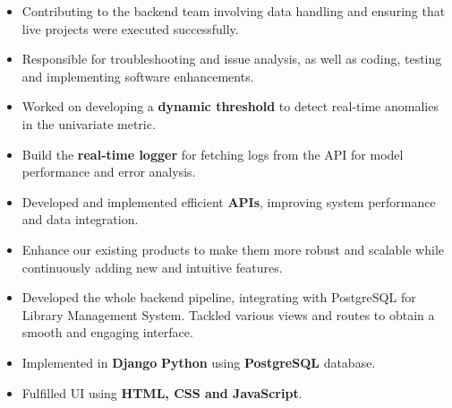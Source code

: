\documentclass[12pt,a4paper]{altacv}
\begin{document}

\begin{itemize}
\item{\small Contributing to the backend team involving data handling and ensuring that live projects were executed successfully.}
\item {\small Responsible for troubleshooting and issue analysis, as well as coding, testing and implementing software enhancements.}
\item { \small Worked on developing a \textbf{dynamic threshold} to detect real-time anomalies in the univariate metric.}
\item { \small Build the \textbf{real-time logger} for fetching logs from the API for model performance and error analysis.}
\item { \small Developed and implemented efficient \textbf{APIs}, improving system performance and data integration.}
\item { \small Enhance our existing products to make them more robust and scalable while continuously adding new and intuitive features.}

\end{itemize}

\medskip






\begin{itemize}
\item {\small Developed the whole backend pipeline, integrating with PostgreSQL for Library Management System. Tackled various views and routes to obtain a smooth and engaging interface.}
\item {\small Implemented in \textbf{Django} \textbf{Python} using \textbf{PostgreSQL} database.}
\item {\small Fulfilled UI using \textbf{HTML, CSS and JavaScript}.}
\end{itemize}
\end{document}
